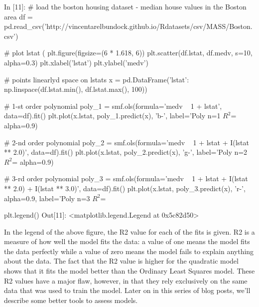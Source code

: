\begin{frame}[fragile]
	\Large
In [11]:
# load the boston housing dataset - median house values in the Boston area
df = pd.read_csv('http://vincentarelbundock.github.io/Rdatasets/csv/MASS/Boston.csv')

# plot lstat (%
plt.figure(figsize=(6 * 1.618, 6))
plt.scatter(df.lstat, df.medv, s=10, alpha=0.3)
plt.xlabel('lstat')
plt.ylabel('medv')
\end{frame}

\begin{frame}[fragile]
	\Large
# points linearlyd space on lstats
x = pd.DataFrame({'lstat': np.linspace(df.lstat.min(), df.lstat.max(), 100)})

# 1-st order polynomial
poly_1 = smf.ols(formula='medv ~ 1 + lstat', data=df).fit()
plt.plot(x.lstat, poly_1.predict(x), 'b-', label='Poly n=1 $R^2$=%
         alpha=0.9)
\end{frame}

\begin{frame}[fragile]
	\Large
# 2-nd order polynomial
poly_2 = smf.ols(formula='medv ~ 1 + lstat + I(lstat ** 2.0)', data=df).fit()
plt.plot(x.lstat, poly_2.predict(x), 'g-', label='Poly n=2 $R^2$=%
         alpha=0.9)

# 3-rd order polynomial
poly_3 = smf.ols(formula='medv ~ 1 + lstat + I(lstat ** 2.0) + I(lstat ** 3.0)', data=df).fit()
plt.plot(x.lstat, poly_3.predict(x), 'r-', alpha=0.9,
         label='Poly n=3 $R^2$=%
\end{frame}

\begin{frame}[fragile]
	\Large
plt.legend()
Out[11]:
<matplotlib.legend.Legend at 0x5c82d50>
\end{frame}

\begin{frame}[fragile]
	\Large
In the legend of the above figure, the R2 value for each of the fits is given. R2 is a measure of how well the model fits the data: a value of one means the model fits the data perfectly while a value of zero means the model fails to explain anything about the data. The fact that the R2 value is higher for the quadratic model shows that it fits the model better than the Ordinary Least Squares model. These R2 values have a major flaw, however, in that they rely exclusively on the same data that was used to train the model. Later on in this series of blog posts, we’ll describe some better tools to assess models.
\end{frame}


